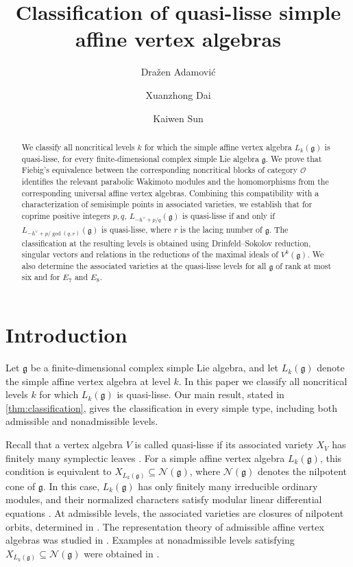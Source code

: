 \documentclass[11pt,a4paper]{amsart}
\title[Classification of quasi-lisse simple affine vertex algebras]{Classification of quasi-lisse simple affine vertex algebras}
\author{Dra\v{z}en Adamovi\'{c}}
\author{Xuanzhong Dai}
\author{Kaiwen Sun}
\date{}
\numberwithin{equation}{section}
\theoremstyle{definition}
\theoremstyle{remark}
\newcommand{\g}{\mathfrak g}
\begin{document}
\begin{abstract}
We classify all noncritical levels $k$ for which the simple affine vertex algebra $L_k(\g)$ is quasi-lisse, for every finite-dimensional complex simple Lie algebra $\g$. We prove that Fiebig's equivalence between the corresponding noncritical blocks of category $\mathcal O$ identifies the relevant parabolic Wakimoto modules and the homomorphisms from the corresponding universal affine vertex algebras. Combining this compatibility with a characterization of semisimple points in associated varieties, we establish that for coprime positive integers $p,q$, $L_{-h^\vee+p/q}(\g)$ is quasi-lisse if and only if $L_{-h^\vee+p/\gcd(q,r)}(\g)$ is quasi-lisse, where $r$ is the lacing number of $\g$. The classification at the resulting levels is obtained using Drinfeld--Sokolov reduction, singular vectors and relations in the reductions of the maximal ideals of $V^k(\g)$. We also determine the associated varieties at the quasi-lisse levels for all $\mathfrak{g}$ of rank at most six and for $E_7$ and $E_8$.
\end{abstract}
\maketitle
\enlargethispage{3pt}
\setcounter{tocdepth}{1}\tableofcontents\medskip
\section{Introduction}\label{sec:classification}

Let $\g$ be a finite-dimensional complex simple Lie algebra, and let $L_k(\g)$ denote the simple affine vertex algebra at level $k$. In this paper we classify all noncritical levels $k$ for which $L_k(\g)$ is quasi-lisse. Our main result, stated in
\cref{thm:classification}, gives the classification in every simple type, including both admissible and nonadmissible levels.


Recall that a vertex algebra $V$ is called quasi-lisse if its associated variety $X_V$ has finitely many symplectic leaves \cite{AK}.
For a simple affine vertex algebra $L_k(\g)$, this condition is equivalent to $X_{L_k(\g)}\subseteq\mathcal N(\g)$, 
where $\mathcal N(\g)$ denotes the nilpotent cone of $\g$.
In this case, $L_k(\g)$ has only finitely many irreducible ordinary modules, and their normalized characters satisfy modular linear differential equations \cite{AK}.
At admissible levels, the associated varieties are closures of nilpotent orbits, determined in \cite{AAV,AVEM}. The representation theory of admissible affine vertex algebras was studied in \cite{AdamovicMilas1995,ArakawaRational2016}.
Examples at nonadmissible levels satisfying
$X_{L_k(\g)}\subseteq\mathcal N(\g)$ were obtained in
\cite{ADS2026, AVD42026,  ArakawaEtAl2025, AK,  ArakawaMoreau2018,ArakawaMoreau2017,ArakawaFutornyKrizka2024}.
\end{document}
